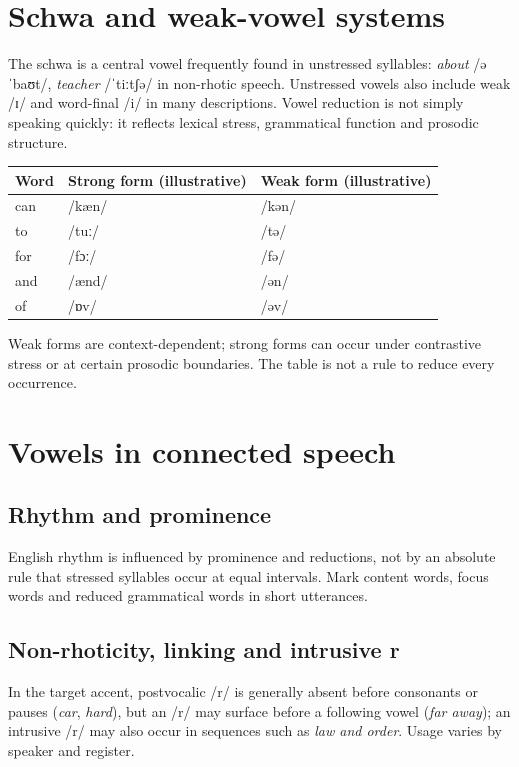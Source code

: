 \section{Schwa and weak-vowel systems}
The schwa  is a central vowel frequently found in unstressed syllables: \emph{about} /əˈbaʊt/, \emph{teacher} /ˈtiːtʃə/ in non-rhotic speech. Unstressed vowels also include weak /ɪ/ and word-final /i/ in many descriptions. Vowel reduction is not simply speaking quickly: it reflects lexical stress, grammatical function and prosodic structure.
\begin{longtable}{lll}
\toprule Word & Strong form (illustrative) & Weak form (illustrative)\\\midrule\endhead
can & /kæn/ & /kən/\\
to & /tuː/ & /tə/\\
for & /fɔː/ & /fə/\\
and & /ænd/ & /ən/\\
of & /ɒv/ & /əv/\\
\bottomrule\end{longtable}
\noindent Weak forms are context-dependent; strong forms can occur under contrastive stress or at certain prosodic boundaries. The table is not a rule to reduce every occurrence.
\section{Vowels in connected speech}
\subsection{Rhythm and prominence}
English rhythm is influenced by prominence and reductions, not by an absolute rule that stressed syllables occur at equal intervals. Mark content words, focus words and reduced grammatical words in short utterances.
\subsection{Non-rhoticity, linking and intrusive r}
In the target accent, postvocalic /r/ is generally absent before consonants or pauses (\emph{car}, \emph{hard}), but an /r/ may surface before a following vowel (\emph{far away}); an intrusive /r/ may also occur in sequences such as \emph{law and order}. Usage varies by speaker and register.
